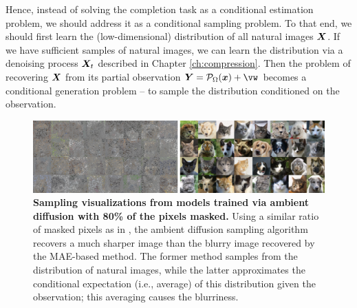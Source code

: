\documentclass[../../book-main.tex]{subfiles}
\begin{document}
Hence, instead of solving the completion task as a conditional estimation problem, we should address it as a conditional sampling problem. To that end, we should first learn the (low-dimensional) distribution of all natural images $\bm{X}$. If we have sufficient samples of natural images, we can learn the distribution via a denoising process $\bm{X}_t$ described in Chapter \ref{ch:compression}. Then the problem of recovering $\bm{X}$ from its partial observation $\Y = \mathcal{P}_\Omega(\x) +\vw$ becomes a conditional generation problem -- to sample the distribution conditioned on the observation.

\begin{figure}
  \centering
  \includegraphics[width=1.0\textwidth]{figs_chap6/ambient_diffusion.png}
  \caption{\small \textbf{Sampling visualizations from models trained via ambient diffusion \cite{Daras-NIPS2023} with 80\% of the pixels masked.} Using a similar ratio of masked pixels as in , the ambient diffusion sampling algorithm recovers a much sharper image than the blurry image recovered by the MAE-based method. The former method samples from the distribution of natural images, while the latter approximates the conditional expectation (i.e., average) of this distribution given the observation; this averaging causes the blurriness.}
  \label{fig:ambient_diffusion}
\end{figure}
\end{document}
